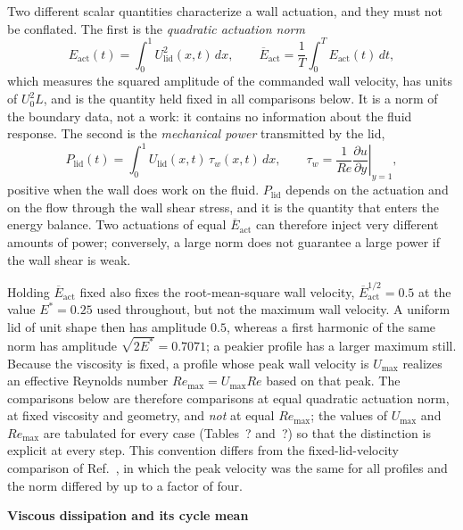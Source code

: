 \documentclass[11pt,a4paper]{article}
\newcommand{\Eact}{E_{\mathrm{act}}}
\newcommand{\Plid}{P_{\mathrm{lid}}}
\newenvironment{chgdel}{\par\color{red}}{\par\color{black}}
\begin{document}
\begin{chgdel}
Two different scalar quantities characterize a wall actuation, and they must not
be conflated. The first is the \emph{quadratic actuation norm}
\begin{equation}
\Eact(t)=\int_0^1 U_{\mathrm{lid}}^2(x,t)\,dx,
\qquad
\overline{E}_{\mathrm{act}}=\frac{1}{T}\int_0^T\Eact(t)\,dt,
\end{equation}
which measures the squared amplitude of the commanded wall velocity, has units of
$U_0^2L$, and is the quantity held fixed in all comparisons below. It is a norm of
the boundary data, not a work: it contains no information about the fluid response.
The second is the \emph{mechanical power} transmitted by the lid,
\begin{equation}
\Plid(t)=\int_0^1 U_{\mathrm{lid}}(x,t)\,\tau_w(x,t)\,dx,
\qquad
\tau_w=\frac{1}{Re}\left.\frac{\partial u}{\partial y}\right|_{y=1},
\end{equation}
positive when the wall does work on the fluid. $\Plid$ depends on the actuation
and on the flow through the wall shear stress, and it is the quantity that enters
the energy balance. Two actuations of equal $\overline{E}_{\mathrm{act}}$ can
therefore inject very different amounts of power; conversely, a large norm does
not guarantee a large power if the wall shear is weak.

Holding $\overline{E}_{\mathrm{act}}$ fixed also fixes the root-mean-square wall
velocity, $\overline{E}_{\mathrm{act}}^{1/2}=0.5$ at the value $E^\ast=0.25$ used
throughout, but not the maximum wall velocity. A uniform lid of unit shape then
has amplitude $0.5$, whereas a first harmonic of the same norm has amplitude
$\sqrt{2E^\ast}=0.7071$; a peakier profile has a larger maximum still. Because
the viscosity is fixed, a profile whose peak wall velocity is $U_{\max}$ realizes
an effective Reynolds number $Re_{\max}=U_{\max}Re$ based on that peak. The
comparisons below are therefore comparisons at equal quadratic actuation norm, at
fixed viscosity and geometry, and \emph{not} at equal $Re_{\max}$; the values of
$U_{\max}$ and $Re_{\max}$ are tabulated for every case
(Tables~? and~?) so that the distinction is
explicit at every step. This convention differs from the fixed-lid-velocity
comparison of Ref.~, in which the peak velocity was the same
for all profiles and the norm differed by up to a factor of four.

\textbf{Viscous dissipation and its cycle mean}


\end{chgdel}
\end{document}
